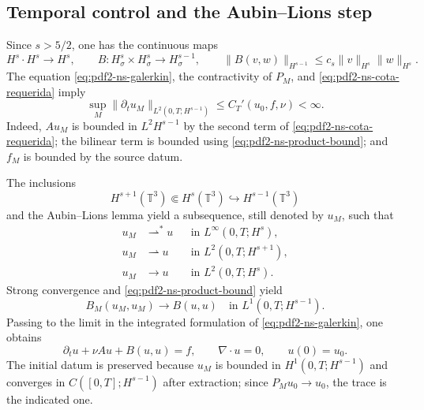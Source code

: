 \subsection{Temporal control and the Aubin--Lions step}

Since $s>5/2$, one has the continuous maps
\begin{equation}\label{eq:pdf2-ns-product-bound}
 H^s\cdot H^s\longrightarrow H^s,
 \qquad
 B:H^s_\sigma\times H^s_\sigma\longrightarrow H^{s-1}_\sigma,
 \qquad
 \|B(v,w)\|_{H^{s-1}}\le c_s\|v\|_{H^s}\|w\|_{H^s}.
\end{equation}
The equation \eqref{eq:pdf2-ns-galerkin}, the contractivity of $P_M$, and
\eqref{eq:pdf2-ns-cota-requerida} imply
\begin{equation}\label{eq:pdf2-ns-time-bound}
 \sup_M\|\partial_tu_M\|_{L^2(0,T;H^{s-1})}
 \le C_T'(u_0,f,\nu)<\infty.
\end{equation}
Indeed, $Au_M$ is bounded in $L^2H^{s-1}$ by the second term of
\eqref{eq:pdf2-ns-cota-requerida}; the bilinear term is bounded using
\eqref{eq:pdf2-ns-product-bound}; and $f_M$ is bounded by the source datum.

The inclusions
\[
 H^{s+1}(\mathbb T^3)\Subset H^s(\mathbb T^3)
 \hookrightarrow H^{s-1}(\mathbb T^3)
\]
and the Aubin--Lions lemma yield a subsequence, still denoted by $u_M$,
such that
\begin{equation}\label{eq:pdf2-ns-compactness}
 \begin{aligned}
 u_M&\rightharpoonup^*u&&\text{in }L^\infty(0,T;H^s),\\
 u_M&\rightharpoonup u&&\text{in }L^2(0,T;H^{s+1}),\\
 u_M&\longrightarrow u&&\text{in }L^2(0,T;H^s).
 \end{aligned}
\end{equation}
Strong convergence and \eqref{eq:pdf2-ns-product-bound} yield
\begin{equation}\label{eq:pdf2-ns-nonlinear-limit}
 B_M(u_M,u_M)\longrightarrow B(u,u)
 \quad\text{in }L^1(0,T;H^{s-1}).
\end{equation}
Passing to the limit in the integrated formulation of
\eqref{eq:pdf2-ns-galerkin}, one obtains
\begin{equation}\label{eq:pdf2-ns-limit-equation}
 \partial_tu+\nu Au+B(u,u)=f,
 \qquad \nabla\!\cdot u=0,
 \qquad u(0)=u_0.
\end{equation}
The initial datum is preserved because
$u_M$ is bounded in $H^1(0,T;H^{s-1})$ and converges in
$C([0,T];H^{s-1})$ after extraction; since $P_Mu_0\to u_0$, the trace is the
indicated one.

